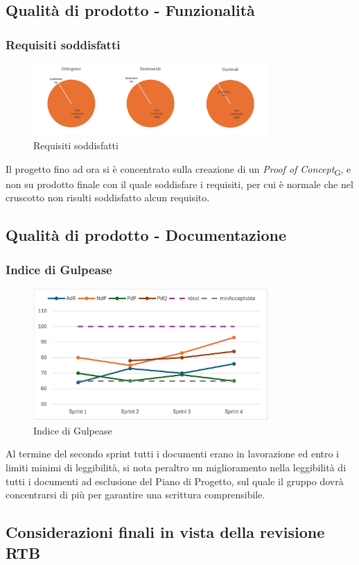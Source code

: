 \subsection{Qualità di prodotto - Funzionalità}
\subsubsection{Requisiti soddisfatti}
\begin{figure}[H]
    \centering
    \includegraphics[width=0.8\textwidth]{./images/requisitisoddisfatti.png}
    \caption{Requisiti soddisfatti}
\end{figure}
Il progetto fino ad ora si è concentrato sulla creazione di un \textit{Proof of Concept}\textsubscript{G}, e non su prodotto finale con il quale soddisfare i requisiti, per cui è normale che nel cruscotto non risulti soddisfatto alcun requisito.

\subsection{Qualità di prodotto - Documentazione}
\subsubsection{Indice di Gulpease}
\begin{figure}[H]
    \centering
    \includegraphics[width=0.8\textwidth]{./images/gulpease.png}
    \caption{Indice di Gulpease}
\end{figure}
Al termine del secondo sprint tutti i documenti erano in lavorazione ed entro i limiti minimi di leggibilità, si nota peraltro un miglioramento nella leggibilità di tutti i documenti ad esclusione del Piano di Progetto, sul quale il gruppo dovrà concentrarsi di più per garantire una scrittura comprensibile.

\subsection{Considerazioni finali in vista della revisione RTB}